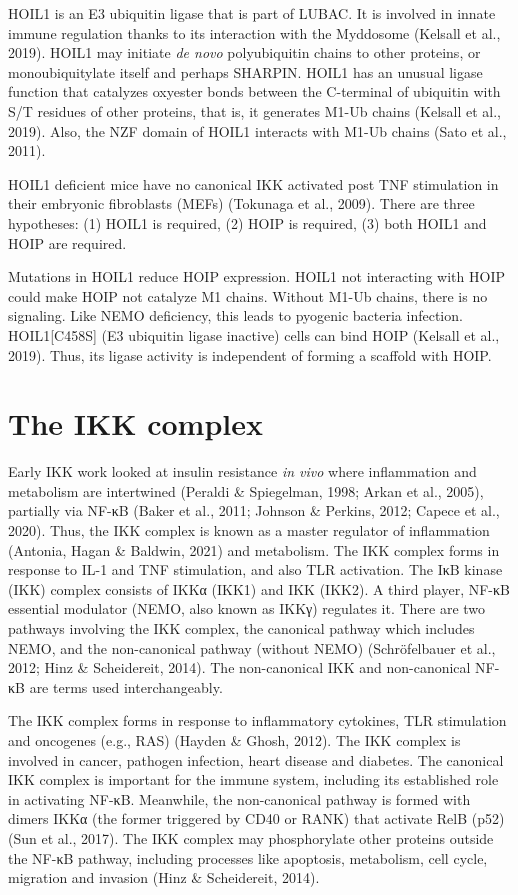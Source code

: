 HOIL1 is an E3 ubiquitin ligase that is part of LUBAC. It is involved in innate immune regulation thanks to its interaction with the Myddosome (Kelsall et al., 2019). HOIL1 may initiate \emph{de novo} polyubiquitin chains to other proteins, or monoubiquitylate itself and perhaps SHARPIN. HOIL1 has an unusual ligase function that catalyzes oxyester bonds between the C-terminal of ubiquitin with S/T residues of other proteins, that is, it generates M1-Ub chains (Kelsall et al., 2019). Also, the NZF domain of HOIL1 interacts with M1-Ub chains (Sato et al., 2011).

HOIL1 deficient mice have no canonical IKK activated post TNF stimulation in their embryonic fibroblasts (MEFs) (Tokunaga et al., 2009). There are three hypotheses: (1) HOIL1 is required, (2) HOIP is required, (3) both HOIL1 and HOIP are required.

Mutations in HOIL1 reduce HOIP expression. HOIL1 not interacting with HOIP could make HOIP not catalyze M1 chains. Without M1-Ub chains, there is no signaling. Like NEMO deficiency, this leads to pyogenic bacteria infection. HOIL1[C458S] (E3 ubiquitin ligase inactive) cells can bind HOIP (Kelsall et al., 2019). Thus, its ligase activity is independent of forming a scaffold with HOIP.

\section{The IKK complex}
\label{section:IKK}
Early IKK work looked at insulin resistance \emph{in vivo} where inflammation and metabolism are intertwined (Peraldi \& Spiegelman, 1998; Arkan et al., 2005), partially via NF-κB (Baker et al., 2011; Johnson \& Perkins, 2012; Capece et al., 2020). Thus, the IKK complex is known as a master regulator of inflammation (Antonia, Hagan \& Baldwin, 2021) and metabolism. The IKK complex forms in response to IL-1 and TNF stimulation, and also TLR activation. The IκB kinase (IKK) complex consists of IKKα (IKK1) and IKK{\textbeta} (IKK2). A third player, NF-κB essential modulator (NEMO, also known as IKKγ) regulates it. There are two pathways involving the IKK complex, the canonical pathway which includes NEMO, and the non-canonical pathway (without NEMO) (Schröfelbauer et al., 2012; Hinz \& Scheidereit, 2014). The non-canonical IKK and non-canonical NF-κB are terms used interchangeably.

The IKK complex forms in response to inflammatory cytokines, TLR stimulation and oncogenes (e.g., RAS) (Hayden \& Ghosh, 2012). The IKK complex is involved in cancer, pathogen infection, heart disease and diabetes. The canonical IKK complex is important for the immune system, including its established role in activating NF-κB. Meanwhile, the non-canonical pathway is formed with dimers IKKα (the former triggered by CD40 or RANK) that activate RelB (p52) (Sun et al., 2017). The IKK complex may phosphorylate other proteins outside the NF-κB pathway, including processes like apoptosis, metabolism, cell cycle, migration and invasion (Hinz \& Scheidereit, 2014).

